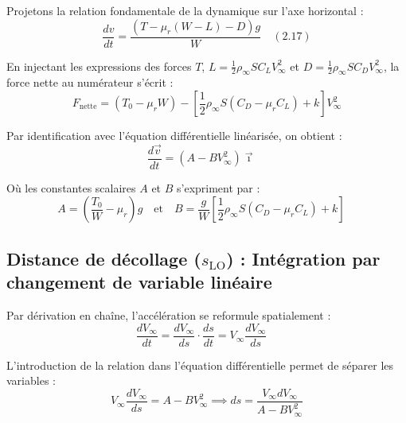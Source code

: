 				Projetons la relation fondamentale de la dynamique sur l'axe horizontal :
				\begin{equation}
					\frac{dv}{dt} = \frac{(T - \mu_r(W - L) - D) g}{W} \quad (2.17)
				\end{equation}
				
				En injectant les expressions des forces $T$, $L = \frac{1}{2}\rho_\infty S C_L V_\infty^2$ et $D = \frac{1}{2}\rho_\infty S C_D V_\infty^2$, la force nette au numérateur s'écrit :
				\begin{equation*}
					F_{\text{nette}} = (T_0 - \mu_rW) - \left[\frac{1}{2}\rho_\infty S(C_D - \mu_rC_L) + k\right]V_\infty^2
				\end{equation*}
				
				Par identification avec l'équation différentielle linéarisée, on obtient :
				\begin{equation}
					\frac{d\vec{v}}{dt} = (A - BV_\infty^2)\vec{\imath} \quad 
				\end{equation}
				
				Où les constantes scalaires $A$ et $B$ s'expriment par :
				\begin{equation}
					A = \left(\frac{T_0}{W} - \mu_r\right)g \quad \text{et} \quad B = \frac{g}{W}\left[\frac{1}{2}\rho_\infty S(C_D - \mu_rC_L) + k\right] \quad 
				\end{equation}
				
		

	
		
		
		
		\subsection{Distance de décollage ($s_{\text{LO}}$) : Intégration par changement de variable linéaire}
		
			Par dérivation en chaîne, l'accélération se reformule spatialement :
			\begin{equation}
				\frac{dV_\infty}{dt} = \frac{dV_\infty}{ds} \cdot \frac{ds}{dt} = V_\infty\frac{dV_\infty}{ds} \quad 
			\end{equation}
			
			L'introduction de la relation  dans l'équation différentielle  permet de séparer les variables :
			\begin{equation}
				V_\infty\frac{dV_\infty}{ds} = A - BV_\infty^2 \implies ds = \frac{V_\infty dV_\infty}{A - BV_\infty^2} 
			\end{equation}
			
